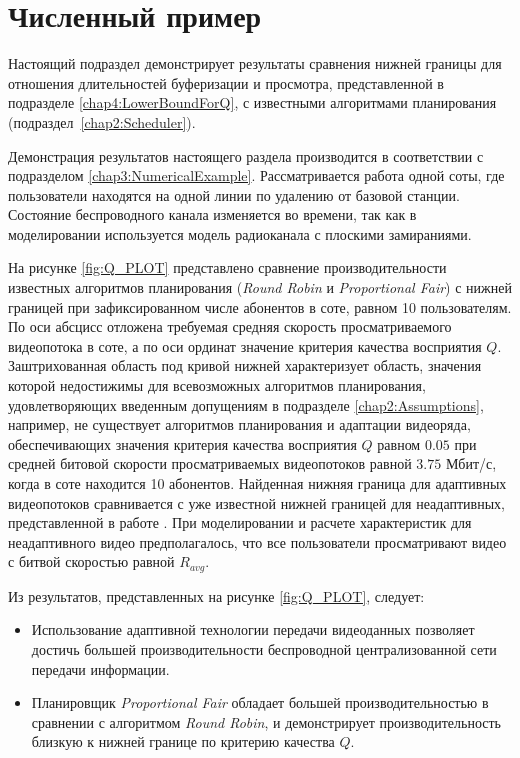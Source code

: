 \section{Численный пример}
\label{chap4:NumericalExample}

Настоящий подраздел демонстрирует результаты сравнения нижней границы для отношения длительностей буферизации и просмотра, представленной в подразделе \ref{chap4:LowerBoundForQ}, с известными алгоритмами планирования (подраздел~\ref{chap2:Scheduler}).

Демонстрация результатов настоящего раздела производится в соответствии с подразделом \ref{chap3:NumericalExample}. Рассматривается работа одной соты, где пользователи находятся на одной линии по удалению от базовой станции. Состояние беспроводного канала изменяется во времени, так как в моделировании используется модель радиоканала с плоскими замираниями.

На рисунке \ref{fig:Q_PLOT} представлено сравнение производительности известных алгоритмов планирования (\textit{Round Robin} и \textit{Proportional Fair}) с нижней границей при зафиксированном числе абонентов в соте, равном 10 пользователям. По оси абсцисс отложена требуемая средняя скорость просматриваемого видеопотока в соте, а по оси ординат значение критерия качества восприятия $Q$. Заштрихованная область под кривой нижней характеризует область, значения которой недостижимы для всевозможных алгоритмов планирования, удовлетворяющих введенным допущениям в подразделе \ref{chap2:Assumptions}, например, не существует алгоритмов планирования и адаптации видеоряда, обеспечивающих значения критерия качества восприятия $Q$ равном $0.05$ при средней битовой скорости просматриваемых видеопотоков равной $3.75$ Мбит/с, когда в соте находится 10 абонентов. Найденная нижняя граница для адаптивных видеопотоков сравнивается с уже известной нижней границей для неадаптивных, представленной в работе \cite{Bakin_Globecom}. При моделировании и расчете характеристик для неадаптивного видео предполагалось, что все пользователи просматривают видео с битвой скоростью равной $R_{avg}$.


Из результатов, представленных на рисунке \ref{fig:Q_PLOT}, следует:
\begin{itemize}
	\item Использование адаптивной технологии передачи видеоданных позволяет достичь большей производительности беспроводной централизованной сети передачи информации.
	\item Планировщик \textit{Proportional Fair} обладает большей производительностью в сравнении с алгоритмом \textit{Round Robin}, и демонстрирует производительность близкую к нижней границе по критерию качества $Q$.
\end{itemize}



